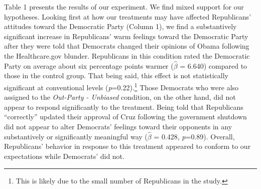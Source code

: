 \documentclass[12pt, letterpaper]{article}
\begin{document}
Table 1 presents the results of our experiment. We find mixed support for our hypotheses. Looking first at how our treatments may have affected Republicans' attitudes toward the Democratic Party (Column 1), we find a substantively significant increase in Republicans' warm feelings toward the Democratic Party after they were told that Democrats changed their opinions of Obama following the Healthcare.gov blunder. Republicans in this condition rated the Democratic Party on average about six percentage points warmer ($\hat{\beta}$ = 6.640) compared to those in the control group. That being said, this effect is not statistically significant at conventional levels (\textit{p}=0.22).\footnote{This is likely due to the small number of Republicans in the study.} Those Democrats who were also assigned to the \textit{Out-Party - Unbiased} condition, on the other hand, did not appear to respond significantly to the treatment. Being told that Republicans  ``correctly'' updated their approval of Cruz following the government shutdown did not appear to alter Democrats' feelings toward their opponents in any substantively or significantly meaningful way ($\hat{\beta}$ = 0.428, \textit{p}=0.89). Overall, Republicans' behavior in response to this treatment appeared to conform to our expectations while Democrats' did not.
\end{document}
